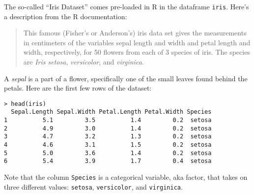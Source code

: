 \documentclass[addpoints,12pt]{exam}
\begin{document}
\begin{questions}
\question The so-called ``Iris Dataset'' comes pre-loaded in R in the dataframe \texttt{iris}. Here's a description from the R documentation:
	\begin{quote}
		This famous (Fisher's or Anderson's) iris data set gives the measurements in centimeters of the variables sepal length and width and petal length and width, respectively, for 50 flowers from each of 3 species of iris. The species are \emph{Iris setosa}, \emph{versicolor}, and \emph{virginica}.
	\end{quote}
A \emph{sepal} is a part of a flower, specifically one of the small leaves found behind the petals. Here are the first few rows of the dataset:
\begin{verbatim}
> head(iris)
  Sepal.Length Sepal.Width Petal.Length Petal.Width Species
1          5.1         3.5          1.4         0.2  setosa
2          4.9         3.0          1.4         0.2  setosa
3          4.7         3.2          1.3         0.2  setosa
4          4.6         3.1          1.5         0.2  setosa
5          5.0         3.6          1.4         0.2  setosa
6          5.4         3.9          1.7         0.4  setosa
\end{verbatim}
Note that the column \texttt{Species} is a categorical variable, aka factor, that takes on three different values: \texttt{setosa}, \texttt{versicolor}, and \texttt{virginica}.
\end{questions}
\end{document}
